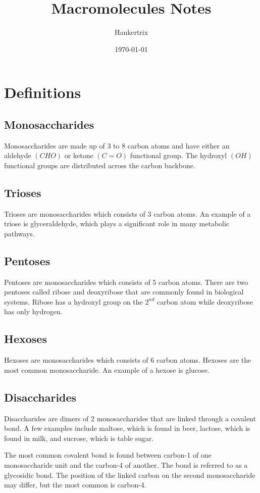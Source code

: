 \documentclass[11pt]{article}
\author{Hankertrix}
\date{\today}
\title{Macromolecules Notes}
\begin{document}
\maketitle
\setcounter{tocdepth}{2}
\tableofcontents \clearpage\newpage
\section{Definitions}
\label{sec:org15b04f2}

\subsection{Monosaccharides}
\label{sec:org8a6d9bd}
Monosaccharides are made up of 3 to 8 carbon atoms and have either an aldehyde \((CHO)\) or ketone \((C=O)\) functional group. The hydroxyl \((OH)\) functional groups are distributed across the carbon backbone.
\subsection{Trioses}
\label{sec:org24397c0}
Trioses are monosaccharides which consists of 3 carbon atoms. An example of a triose is glyceraldehyde, which plays a significant role in many metabolic pathways.
\subsection{Pentoses}
\label{sec:org34d44c0}
Pentoses are monosaccharides which consists of 5 carbon atoms. There are two pentoses called ribose and deoxyribose that are commonly found in biological systems. Ribose has a hydroxyl group on the \(2^{nd}\) carbon atom while deoxyribose has only hydrogen.
\subsection{Hexoses}
\label{sec:orgb3c7016}
Hexoses are monosaccharides which consists of 6 carbon atoms. Hexoses are the most common monosaccharide. An example of a hexose is glucose.
\subsection{Disaccharides}
\label{sec:orgb7f2023}
Disaccharides are dimers of 2 monosaccharides that are linked through a covalent bond. A few examples include maltose, which is found in beer, lactose, which is found in milk, and sucrose, which is table sugar.


The most common covalent bond is found between carbon-1 of one monosaccharide unit and the carbon-4 of another. The bond is referred to as a glycosidic bond. The position of the linked carbon on the second monosaccharide may differ, but the most common is carbon-4.
\end{document}
